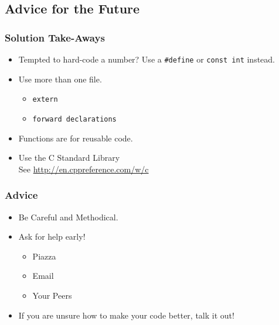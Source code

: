\documentclass{beamer}
\begin{document}
\subsection{Advice for the Future}
\begin{frame}
	\frametitle{Solution Take-Aways}
	\begin{itemize}
		\item Tempted to hard-code a number? Use a \texttt{\#define} or \texttt{const int} instead. \pause
		\item{Use more than one file.
			\begin{itemize}
				\item \texttt{extern}
				\item \texttt{forward declarations}
			\end{itemize}
		} \pause
		\item Functions are for reusable code. \pause
		\item{Use the C Standard Library \\ See \url{http://en.cppreference.com/w/c}}
	\end{itemize}
\end{frame}

\begin{frame}
	\frametitle{Advice}
	\begin{itemize}
		\item Be Careful and Methodical. \pause
		\item{Ask for help early!
			\begin{itemize}
				\item Piazza
				\item Email
				\item Your Peers
			\end{itemize}
		} \pause
		\item If you are unsure how to make your code better, talk it out!
	\end{itemize}
\end{frame}
\end{document}
